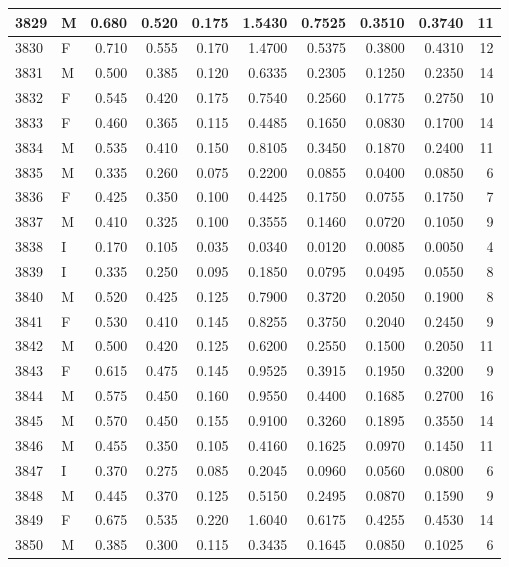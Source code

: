 \documentclass[9pt,twocolumn,twoside,]{pnas-new}
\begin{document}
\begin{tabular}{l|l|r|r|r|r|r|r|r|r}
\hline
3829 & M & 0.680 & 0.520 & 0.175 & 1.5430 & 0.7525 & 0.3510 & 0.3740 & 11\\
\hline
3830 & F & 0.710 & 0.555 & 0.170 & 1.4700 & 0.5375 & 0.3800 & 0.4310 & 12\\
\hline
3831 & M & 0.500 & 0.385 & 0.120 & 0.6335 & 0.2305 & 0.1250 & 0.2350 & 14\\
\hline
3832 & F & 0.545 & 0.420 & 0.175 & 0.7540 & 0.2560 & 0.1775 & 0.2750 & 10\\
\hline
3833 & F & 0.460 & 0.365 & 0.115 & 0.4485 & 0.1650 & 0.0830 & 0.1700 & 14\\
\hline
3834 & M & 0.535 & 0.410 & 0.150 & 0.8105 & 0.3450 & 0.1870 & 0.2400 & 11\\
\hline
3835 & M & 0.335 & 0.260 & 0.075 & 0.2200 & 0.0855 & 0.0400 & 0.0850 & 6\\
\hline
3836 & F & 0.425 & 0.350 & 0.100 & 0.4425 & 0.1750 & 0.0755 & 0.1750 & 7\\
\hline
3837 & M & 0.410 & 0.325 & 0.100 & 0.3555 & 0.1460 & 0.0720 & 0.1050 & 9\\
\hline
3838 & I & 0.170 & 0.105 & 0.035 & 0.0340 & 0.0120 & 0.0085 & 0.0050 & 4\\
\hline
3839 & I & 0.335 & 0.250 & 0.095 & 0.1850 & 0.0795 & 0.0495 & 0.0550 & 8\\
\hline
3840 & M & 0.520 & 0.425 & 0.125 & 0.7900 & 0.3720 & 0.2050 & 0.1900 & 8\\
\hline
3841 & F & 0.530 & 0.410 & 0.145 & 0.8255 & 0.3750 & 0.2040 & 0.2450 & 9\\
\hline
3842 & M & 0.500 & 0.420 & 0.125 & 0.6200 & 0.2550 & 0.1500 & 0.2050 & 11\\
\hline
3843 & F & 0.615 & 0.475 & 0.145 & 0.9525 & 0.3915 & 0.1950 & 0.3200 & 9\\
\hline
3844 & M & 0.575 & 0.450 & 0.160 & 0.9550 & 0.4400 & 0.1685 & 0.2700 & 16\\
\hline
3845 & M & 0.570 & 0.450 & 0.155 & 0.9100 & 0.3260 & 0.1895 & 0.3550 & 14\\
\hline
3846 & M & 0.455 & 0.350 & 0.105 & 0.4160 & 0.1625 & 0.0970 & 0.1450 & 11\\
\hline
3847 & I & 0.370 & 0.275 & 0.085 & 0.2045 & 0.0960 & 0.0560 & 0.0800 & 6\\
\hline
3848 & M & 0.445 & 0.370 & 0.125 & 0.5150 & 0.2495 & 0.0870 & 0.1590 & 9\\
\hline
3849 & F & 0.675 & 0.535 & 0.220 & 1.6040 & 0.6175 & 0.4255 & 0.4530 & 14\\
\hline
3850 & M & 0.385 & 0.300 & 0.115 & 0.3435 & 0.1645 & 0.0850 & 0.1025 & 6\\

\end{tabular}
\end{document}
